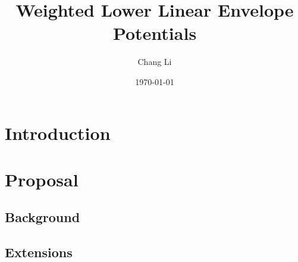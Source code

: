 \documentclass{article}
\title{Weighted Lower Linear Envelope Potentials}
\author{Chang Li}
\date{\today}
\begin{document}
	\maketitle
	
	\section{Introduction}
	
	\section{Proposal}
	
	\subsection{Background}
	
	\subsection{Extensions}
\end{document}
